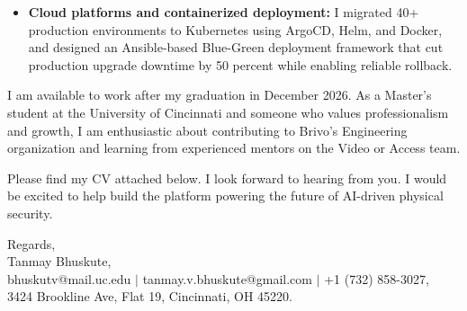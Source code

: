 \documentclass[11pt]{letter}
\begin{document}
\begin{letter}{}
\begin{itemize}[leftmargin=*, itemsep=0.45em]
    \item \textbf{Cloud platforms and containerized deployment:} I migrated 40+ production environments to Kubernetes using ArgoCD, Helm, and Docker, and designed an Ansible-based Blue-Green deployment framework that cut production upgrade downtime by 50 percent while enabling reliable rollback.
\end{itemize}

I am available to work after my graduation in December 2026. As a Master's student at the University of Cincinnati and someone who values professionalism and growth, I am enthusiastic about contributing to Brivo's Engineering organization and learning from experienced mentors on the Video or Access team.

Please find my CV attached below. I look forward to hearing from you. I would be excited to help build the platform powering the future of AI-driven physical security.

{\setlength{\parskip}{0pt}
Regards,\\
Tanmay Bhuskute,\\
bhuskutv@mail.uc.edu $\mid$ tanmay.v.bhuskute@gmail.com $\mid$ +1 (732) 858-3027,\\
3424 Brookline Ave, Flat 19, Cincinnati, OH 45220.
}

\end{letter}
\end{document}
